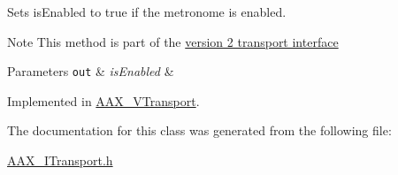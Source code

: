 Sets is\+Enabled to true if the metronome is enabled. 

\begin{DoxyNote}{Note}
This method is part of the \hyperlink{a00083}{version 2 transport interface}
\end{DoxyNote}

\begin{DoxyParams}[1]{Parameters}
\mbox{\tt out}  & {\em is\+Enabled} & \\
\hline
\end{DoxyParams}


Implemented in \hyperlink{a00141_a9d6175da58f56358e7d05a7d1045c95a}{A\+A\+X\+\_\+\+V\+Transport}.



The documentation for this class was generated from the following file\+:\begin{DoxyCompactItemize}
\item 
\hyperlink{a00263}{A\+A\+X\+\_\+\+I\+Transport.\+h}\end{DoxyCompactItemize}
